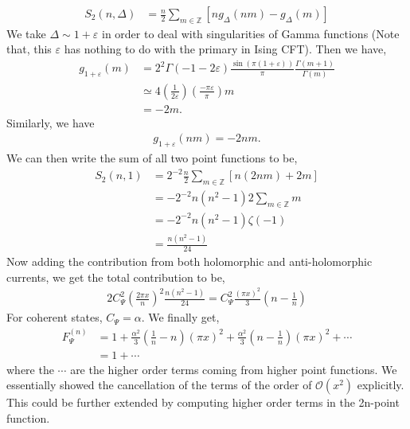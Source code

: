 \documentclass[11pt]{article}
\newcommand{\mO}{\mathcal{O}}
\newcommand{\lb}{\left(}
\newcommand{\rb}{\right)}
\begin{document}
\begin{align}
    S_2(n,\Delta) &= \frac{n}{2}\sum_{m\in \mathbb{Z}} \left[ng_\Delta(nm) - g_\Delta(m)\right] 
\end{align}
We take $\Delta \sim 1+\varepsilon$ in order to deal with singularities of Gamma functions (Note that, this $\varepsilon$ has nothing to do with the primary in Ising CFT). Then we have,
\begin{align}
    g_{1+\varepsilon}(m) &= 2^2 \Gamma(-1-2\varepsilon)\frac {\sin(\pi (1+\varepsilon))}{\pi}\frac{\Gamma (m+1)}{\Gamma(m)} 
    \\
    &\simeq 4 \lb \frac{1}{2\varepsilon} \rb \lb \frac{-\pi \varepsilon}{\pi}\rb m \\
    &= -2m .
\end{align}
Similarly, we have
\begin{align}
    g_{1+\varepsilon}(nm) = -2nm.
\end{align}
We can then write the sum of all two point functions to be,
\begin{align}
    S_2(n,1) &= 2^{-2}\frac{n}{2}\sum_{m\in \mathbb{Z}} \left[ n(2nm) + 2m \right]\\
    &= -2^{-2}n(n^2-1) 2\sum_{m\in \mathbb{Z}} m \\
    &= -2^{-2}n(n^2 - 1) \zeta(-1) \\
    &= \frac{n(n^2-1)}{24}
\end{align}
Now adding the contribution from both holomorphic and anti-holomorphic currents, we get the total contribution to be,
\begin{align}
    2C_\Psi^2 \lb\frac{2\pi x}{n}\rb^2 \frac{n(n^2-1)}{24} = C_\Psi^2\frac{(\pi x)^2}{3} \lb n-\frac{1}{n}\rb
\end{align}
For coherent states, $C_\Psi = \alpha$. We finally get, 
\begin{align}
    F_\Psi^{(n)} &= 1+ \frac{\alpha^2}{3} \lb\frac{1}{n}-n\rb (\pi x)^2 + \frac{\alpha^2}{3}\lb n-\frac{1}{n}\rb(\pi x)^2 +  \cdots\\
    &= 1 + \cdots
\end{align}
where the $\cdots$ are the higher order terms coming from higher point functions. We essentially showed the cancellation of the terms of the order of $\mO(x^2)$ explicitly. This could be further extended by computing higher order terms in the 2n-point function. 


\end{document}
